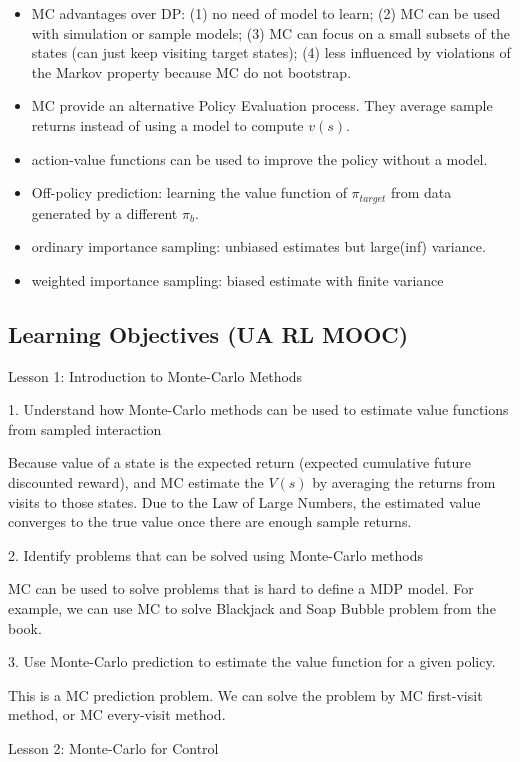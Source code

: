 \documentclass[sutton_barto_notes.tex]{subfiles}
\begin{document}
\begin{itemize}
\item MC advantages over DP: (1) no need of model to learn; (2) MC can be used with simulation or sample models; (3) MC can focus on a small subsets of the states (can just keep visiting target states); (4) less influenced by violations of the Markov property because MC do not bootstrap.
\item MC provide an alternative Policy Evaluation process. They average sample returns instead of using a model to compute $v(s)$.
\item action-value functions can be used to improve the policy without a model.
\item Off-policy prediction: learning the value function of $\pi_{target}$ from data generated by a different $\pi_b$.
\item ordinary importance sampling: unbiased estimates but large(inf) variance.
\item weighted importance sampling: biased estimate with finite variance
\end{itemize}


\subsection{Learning Objectives (UA RL MOOC)}

Lesson 1: Introduction to Monte-Carlo Methods 

1. Understand how Monte-Carlo methods can be used to estimate value functions from sampled interaction 

Because value of a state is the expected return (expected cumulative future discounted reward), and MC estimate the $V(s)$ by averaging the returns from visits to those states. Due to the Law of Large Numbers, the estimated value converges to the true value once there are enough sample returns.


2. Identify problems that can be solved using Monte-Carlo methods 

MC can be used to solve problems that is hard to define a MDP model. For example, we can use MC to solve Blackjack and Soap Bubble problem from the book.

3. Use Monte-Carlo prediction to estimate the value function for a given policy. 

This is a MC prediction problem. We can solve the problem by MC first-visit method, or MC every-visit method.

Lesson 2: Monte-Carlo for Control 
\end{document}
